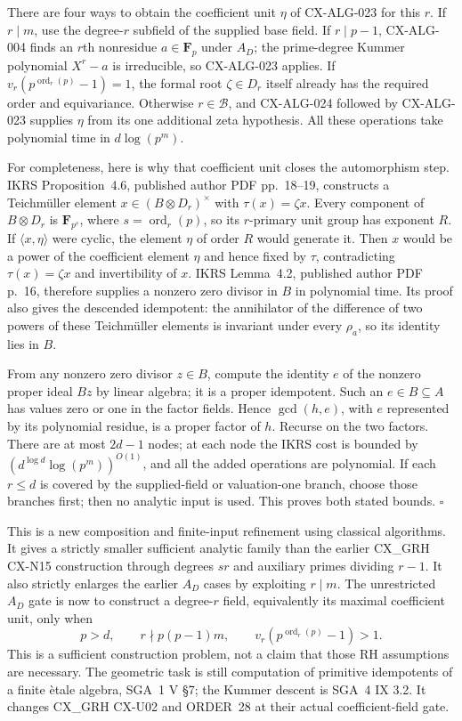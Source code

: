 \documentclass[11pt,a4paper]{article}
\begin{document}
There are four ways to obtain the coefficient unit $\eta$ of
CX-ALG-023 for this $r$.
If $r\mid m$, use the degree-$r$ subfield of the supplied base field.
If $r\mid p-1$, CX-ALG-004 finds an $r$th nonresidue $a\in\mathbf F_p$
under $A_D$; the prime-degree Kummer polynomial $X^r-a$ is irreducible,
so CX-ALG-023 applies. If $v_r(p^{\operatorname{ord}_r(p)}-1)=1$,
the formal root $\zeta\in D_r$ itself already has the required order
and equivariance. Otherwise $r\in\mathcal B$, and CX-ALG-024 followed
by CX-ALG-023 supplies $\eta$ from its one additional zeta hypothesis.
All these operations take polynomial time in $d\log(p^m)$.

For completeness, here is why that coefficient unit closes the
automorphism step. IKRS Proposition~4.6, published author PDF
pp.~18--19, constructs a Teichm\"uller element
$x\in(B\otimes D_r)^\times$ with
$\tau(x)=\zeta x$. Every component of $B\otimes D_r$ is
$\mathbf F_{p^s}$, where $s=\operatorname{ord}_r(p)$, so its
$r$-primary unit group has exponent $R$.
If $\langle x,\eta\rangle$ were cyclic, the element $\eta$ of
order $R$ would generate it. Then $x$ would be a power of the
coefficient element $\eta$ and hence fixed by $\tau$, contradicting
$\tau(x)=\zeta x$ and invertibility of $x$.
IKRS Lemma~4.2, published author PDF p.~16, therefore supplies a
nonzero zero divisor in $B$ in polynomial time. Its proof also gives
the descended idempotent: the annihilator of the difference of two
powers of these Teichm\"uller elements is invariant under every
$\rho_a$, so its identity lies in $B$.

From any nonzero zero divisor $z\in B$, compute the identity $e$ of
the nonzero proper ideal $Bz$ by linear algebra; it is a proper
idempotent. Such an $e\in B\subseteq A$ has values zero or one in
the factor fields. Hence $\gcd(h,e)$, with $e$ represented by its
polynomial residue, is a proper factor of $h$. Recurse on the two
factors. There are at most $2d-1$ nodes; at each node the IKRS cost
is bounded by $(d^{\log d}\log(p^m))^{O(1)}$, and all the added
operations are polynomial. If each $r\le d$ is covered by the
supplied-field or valuation-one branch, choose those branches first;
then no analytic input is used. This proves both stated bounds.
\hfill$\square$

This is a new composition and finite-input refinement using classical
algorithms. It gives a strictly smaller sufficient analytic family than
the earlier CX\_GRH CX-N15 construction through degrees $sr$ and
auxiliary primes dividing $r-1$. It also strictly enlarges the earlier
$A_D$ cases by exploiting $r\mid m$. The unrestricted $A_D$ gate is
now to construct a degree-$r$ field, equivalently its maximal coefficient
unit, only when
\[
       p>d,\qquad r\nmid p(p-1)m,\qquad
             v_r(p^{\operatorname{ord}_r(p)}-1)>1.
\]
This is a sufficient construction problem, not a claim that those RH
assumptions are necessary. The geometric task is still computation of
primitive idempotents of a finite \`etale algebra, SGA~1 V \S7;
the Kummer descent is SGA~4 IX 3.2. It changes CX\_GRH CX-U02 and
ORDER~28 at their actual coefficient-field gate.
\end{document}
